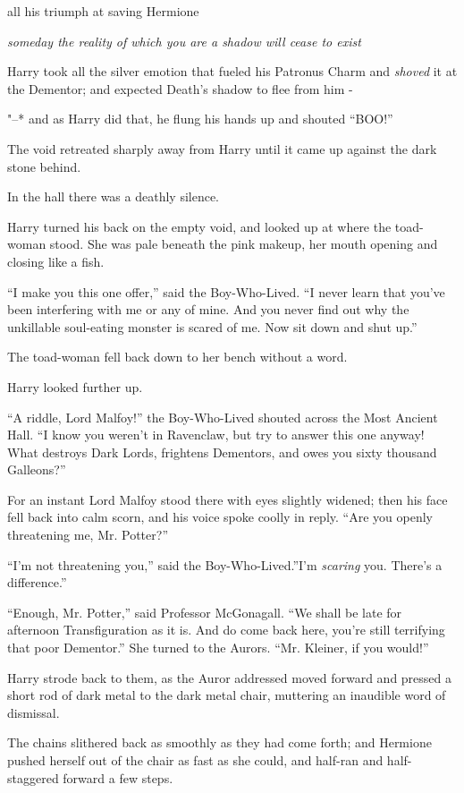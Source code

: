 all his triumph at saving Hermione

\emph{someday the reality of which you are a shadow will cease to exist}

Harry took all the silver emotion that fueled his Patronus Charm and
\emph{shoved} it at the Dementor; and expected Death's shadow to flee
from him -

"--* and as Harry did that, he flung his hands up and shouted ``BOO!''

The void retreated sharply away from Harry until it came up against the
dark stone behind.

In the hall there was a deathly silence.

Harry turned his back on the empty void, and looked up at where the
toad-woman stood. She was pale beneath the pink makeup, her mouth
opening and closing like a fish.

``I make you this one offer,'' said the Boy-Who-Lived. ``I never learn
that you've been interfering with me or any of mine. And you never find
out why the unkillable soul-eating monster is scared of me. Now sit down
and shut up.''

The toad-woman fell back down to her bench without a word.

Harry looked further up.

``A riddle, Lord Malfoy!'' the Boy-Who-Lived shouted across the Most
Ancient Hall. ``I know you weren't in Ravenclaw, but try to answer this
one anyway! What destroys Dark Lords, frightens Dementors, and owes you
sixty thousand Galleons?''

For an instant Lord Malfoy stood there with eyes slightly widened; then
his face fell back into calm scorn, and his voice spoke coolly in reply.
``Are you openly threatening me, Mr. Potter?''

``I'm not threatening you,'' said the Boy-Who-Lived.''I'm \emph{scaring}
you. There's a difference.''

``Enough, Mr. Potter,'' said Professor McGonagall. ``We shall be late
for afternoon Transfiguration as it is. And do come back here, you're
still terrifying that poor Dementor.'' She turned to the Aurors. ``Mr.
Kleiner, if you would!''

Harry strode back to them, as the Auror addressed moved forward and
pressed a short rod of dark metal to the dark metal chair, muttering an
inaudible word of dismissal.

The chains slithered back as smoothly as they had come forth; and
Hermione pushed herself out of the chair as fast as she could, and
half-ran and half-staggered forward a few steps.

